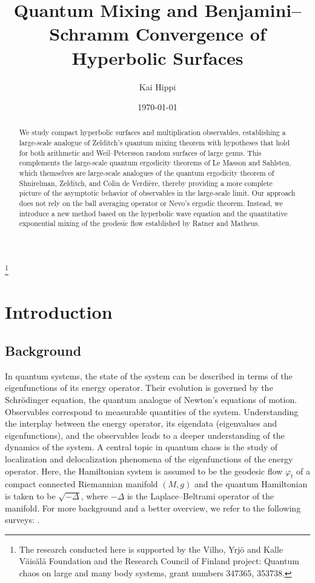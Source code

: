 \documentclass[11pt,twoside,reqno]{amsart} \usepackage{a4wide} \usepackage[T1]{fontenc} \usepackage[utf8]{inputenc} \usepackage{soul}  \usepackage{amsmath} \usepackage{amsfonts} \usepackage{amssymb} \usepackage{mathtools} \usepackage{amsthm} \usepackage{xcolor} \usepackage{graphicx} \usepackage{hyperref} \usepackage{standalone} \usepackage{esint} \usepackage{comment} \usepackage[left=2.3cm,top=3cm,right=2.3cm]{geometry} \usepackage{bm} \usepackage{svg} \usepackage{float} \numberwithin{equation}{section} \theoremstyle{plain} \newtheorem{thm}{Theorem}[section] \newtheorem{theorem}[thm]{Theorem} \newtheorem*{theorem*}{Theorem}\newtheorem{conj}[thm]{Conjecture} \newtheorem{lemma}[thm]{Lemma} \newtheorem{prop}[thm]{Proposition} \newtheorem{proposition}[thm]{Proposition} \newtheorem{cor}[thm]{Corollary} \newtheorem{question}[thm]{Question} \newtheorem{corollary}[thm]{Corollary} \newtheorem{assumption}[thm]{Assumption} \theoremstyle{definition} \newtheorem{defn}[thm]{Definition} \newtheorem{choice}[thm]{Choice} \newtheorem{definition}[thm]{Definition} \newtheorem{ex}[thm]{Example} \newtheorem{notation}[thm]{Notation} \newtheorem*{ack}{Acknowledgements} \theoremstyle{remark} \newtheorem{remark}[thm]{Remark} \newtheorem{bigremark}[thm]{Remark} \usepackage{xcolor} \newcommand{\red}[1]{ {\color{Red}#1} } \newcommand{\blue}[1]{ {\color{Blue}#1} } \author{Kai Hippi} \address{Aalto University, Espoo, Finland} \email{kai.hippi@aalto.fi}
\title[Quantum Mixing and Benjamini--Schramm Convergence of Hyperbolic Surfaces]{Quantum Mixing and Benjamini--Schramm Convergence of Hyperbolic Surfaces}
\date{\today}
\begin{document}
\begin{abstract}
	We study compact hyperbolic surfaces and multiplication observables, establishing a large-scale analogue of Zelditch’s quantum mixing theorem with hypotheses that hold for both arithmetic and Weil--Petersson random surfaces of large genus. This complements the large-scale quantum ergodicity theorems of Le Masson and Sahlsten, which themselves are large-scale analogues of the quantum ergodicity theorem of Shnirelman, Zelditch, and Colin de Verdi\`{e}re, thereby providing a more complete picture of the asymptotic behavior of observables in the large-scale limit. Our approach does not rely on the ball averaging operator or Nevo’s ergodic theorem. Instead, we introduce a new method based on the hyperbolic wave equation and the quantitative exponential mixing of the geodesic flow established by Ratner and Matheus.
\end{abstract}

\thanks{The research conducted here is supported by the Vilho, Yrjö and Kalle Väisälä Foundation and the Research Council of Finland project: Quantum chaos on large and many body systems, grant numbers 347365, 353738.}




\maketitle

\section{Introduction}

\subsection{Background}

\label{Ssec: Background}

In quantum systems, the state of the system can be described in terms of the eigenfunctions of its energy operator. Their evolution is governed by the Schrödinger equation, the quantum analogue of Newton’s equations of motion. Observables correspond to measurable quantities of the system. Understanding the interplay between the energy operator, its eigendata (eigenvalues and eigenfunctions), and the observables leads to a deeper understanding of the dynamics of the system. A central topic in quantum chaos is the study of localization and delocalization phenomena of the eigenfunctions of the energy operator. Here, the Hamiltonian system is assumed to be the geodesic flow $ \varphi_{t} $ of a compact connected Riemannian manifold $ ( M,g ) $ and the quantum Hamiltonian is taken to be $ \sqrt{ -\Delta } $, where $ -\Delta $ is the Laplace--Beltrami operator of the manifold. For more background and a better overview, we refer to the following surveys: \cite{Zel05, Sar11, Zel19, Ana22, Mar25}.
\end{document}
